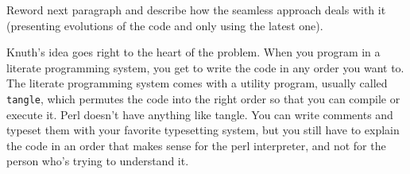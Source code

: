 \begin{TODO}
Reword next paragraph and describe how the seamless approach deals with it (presenting evolutions of the
code and only using the latest one).
\end{TODO}
Knuth's idea goes right to the heart of the problem. When you program in a literate programming system, you get to write the code in any order you want to. The literate programming system comes with a utility program, usually called 
\lstinline{tangle}, which permutes the code into the right order so that you can compile or execute it.
Perl doesn't have anything like tangle. You can write comments and typeset them with your favorite typesetting system, but you still have to explain the code in an order that makes sense for the perl interpreter, and not for the person who's trying to understand it.


